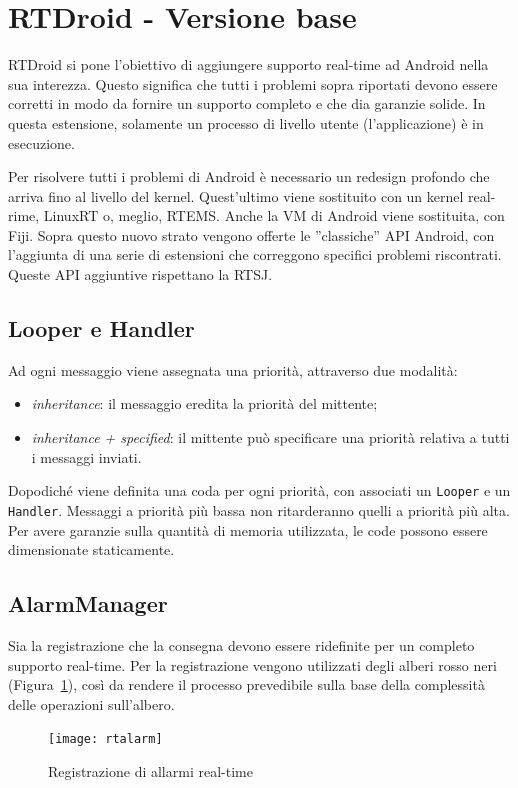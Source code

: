 \section{RTDroid - Versione base}
RTDroid si pone l'obiettivo di aggiungere supporto real-time ad Android nella sua interezza. Questo significa che tutti i problemi sopra riportati devono essere corretti in modo da fornire un supporto completo e che dia garanzie solide. In questa estensione, solamente un processo di livello utente (l'applicazione) è in esecuzione. 

Per risolvere tutti i problemi di Android è necessario un redesign profondo che arriva fino al livello del kernel. Quest'ultimo viene sostituito con un kernel real-rime, LinuxRT o, meglio, RTEMS. Anche la VM di Android viene sostituita, con Fiji. Sopra questo nuovo strato vengono offerte le ''classiche'' API Android, con l'aggiunta di una serie di estensioni che correggono specifici problemi riscontrati. Queste API aggiuntive rispettano la RTSJ. 

\subsection{Looper e Handler}
Ad ogni messaggio viene assegnata una priorità, attraverso due modalità:
\begin{itemize}
	\item\textit{inheritance}: il messaggio eredita la priorità del mittente;
	\item\textit{inheritance + specified}: il mittente può specificare una priorità relativa a tutti i messaggi inviati.
\end{itemize}
Dopodiché viene definita una coda per ogni priorità, con associati un \texttt{Looper} e un \texttt{Handler}. Messaggi a priorità più bassa non ritarderanno quelli a priorità più alta. Per avere garanzie sulla quantità di memoria utilizzata, le code possono essere dimensionate staticamente.

\subsection{AlarmManager}
Sia la registrazione che la consegna devono essere ridefinite per un completo supporto real-time. Per la registrazione vengono utilizzati degli alberi rosso neri (Figura~\ref{fig:rtalarm}), così da rendere il processo prevedibile sulla base della complessità delle operazioni sull'albero. 
\begin{figure}[h]
	\centering
	\texttt{[image: rtalarm]}
	\caption{Registrazione di allarmi real-time}
	\label{fig:rtalarm}
\end{figure}

